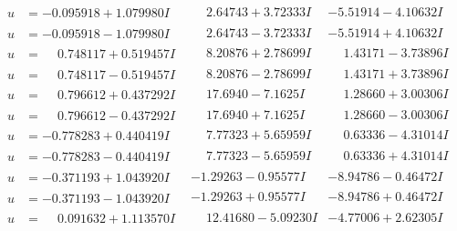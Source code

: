 \documentclass[1p]{elsarticle_modified}
\theoremstyle{definition}
\begin{document}
$$\begin{array}{c|c|c}
\begin{aligned}
u &= -0.095918 + 1.079980 I\end{aligned}
 & \phantom{-}2.64743 + 3.72333 I & -5.51914 - 4.10632 I \\ \hline\begin{aligned}
u &= -0.095918 - 1.079980 I\end{aligned}
 & \phantom{-}2.64743 - 3.72333 I & -5.51914 + 4.10632 I \\ \hline\begin{aligned}
u &= \phantom{-}0.748117 + 0.519457 I\end{aligned}
 & \phantom{-}8.20876 + 2.78699 I & \phantom{-}1.43171 - 3.73896 I \\ \hline\begin{aligned}
u &= \phantom{-}0.748117 - 0.519457 I\end{aligned}
 & \phantom{-}8.20876 - 2.78699 I & \phantom{-}1.43171 + 3.73896 I \\ \hline\begin{aligned}
u &= \phantom{-}0.796612 + 0.437292 I\end{aligned}
 & \phantom{-}17.6940 - 7.1625 I & \phantom{-}1.28660 + 3.00306 I \\ \hline\begin{aligned}
u &= \phantom{-}0.796612 - 0.437292 I\end{aligned}
 & \phantom{-}17.6940 + 7.1625 I & \phantom{-}1.28660 - 3.00306 I \\ \hline\begin{aligned}
u &= -0.778283 + 0.440419 I\end{aligned}
 & \phantom{-}7.77323 + 5.65959 I & \phantom{-}0.63336 - 4.31014 I \\ \hline\begin{aligned}
u &= -0.778283 - 0.440419 I\end{aligned}
 & \phantom{-}7.77323 - 5.65959 I & \phantom{-}0.63336 + 4.31014 I \\ \hline\begin{aligned}
u &= -0.371193 + 1.043920 I\end{aligned}
 & -1.29263 - 0.95577 I & -8.94786 - 0.46472 I \\ \hline\begin{aligned}
u &= -0.371193 - 1.043920 I\end{aligned}
 & -1.29263 + 0.95577 I & -8.94786 + 0.46472 I \\ \hline\begin{aligned}
u &= \phantom{-}0.091632 + 1.113570 I\end{aligned}
 & \phantom{-}12.41680 - 5.09230 I & -4.77006 + 2.62305 I \\ \hline\begin{aligned}

\end{aligned}
\end{array}$$
\end{document}

